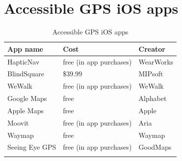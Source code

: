 \documentclass[14pt, letterpaper,twoside]{extreport}
\begin{document}
\hypertarget{accessible-gps}{%
	\section*{Accessible GPS iOS apps}\label{accessible-gps}}


\begin{longtable}[]{@{}
	>{\raggedright\arraybackslash}p{}
	>{\raggedright\arraybackslash}p{}
	>{\raggedright\arraybackslash}p{}@{}
	}
	\toprule\noalign{}
	\textbf{App name} & \textbf{Cost}          & \textbf{Creator} \\
	\midrule\noalign{}
	\endhead
	\bottomrule\noalign{}
	\endlastfoot
	HapticNav         & free (in app purchases) & WearWorks        \\[1.5em]
	BlindSquare       & \$39.99                 & MIPsoft          \\[1.5em]
	WeWalk            & free (in app purchases) & WeWalk           \\[1.5em]
	Google Maps       & free                    & Alphabet         \\[1.5em]
	Apple Maps        & free                    & Apple            \\[1.5em]
	Moovit            & free (in app purchases) & Aria             \\[1.5em]
	Waymap            & free                    & Waymap           \\[1.5em]
	Seeing Eye GPS    & free (in app purchases) & GoodMaps         \\[1.5em]\hline
	\caption{Accessible GPS iOS apps }
\end{longtable}
\end{document}
